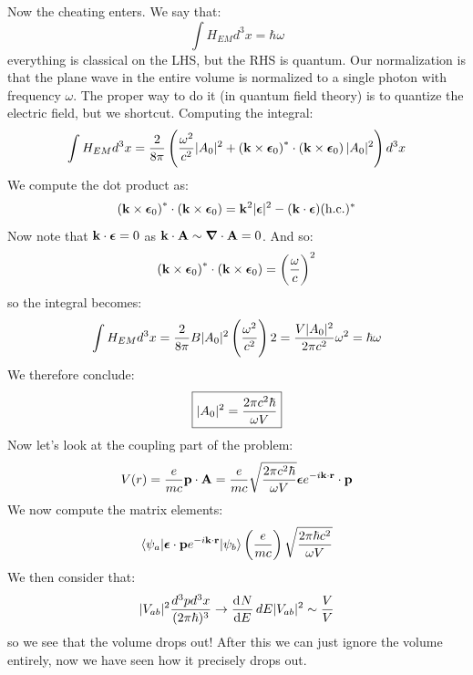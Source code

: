Now the cheating enters. We say that:
\begin{equation}
    \int H_{EM}d^3x = \hbar \omega
\end{equation}
everything is classical on the LHS, but the RHS is quantum. Our normalization is that the plane wave in the entire volume is normalized to a single photon with frequency $\omega$. The proper way to do it (in quantum field theory) is to quantize the electric field, but we shortcut. Computing the integral:
\begin{equation}
    \int H_{EM}d^3x = \frac{2}{8\pi}\left(\frac{\omega^2}{c^2}\lvert A_0 \rvert^2 + \left(\mathbf{k} \times \mbox{\boldmath$ \epsilon $}_0\right)^* \cdot \left(\mathbf{k} \times \mbox{\boldmath$ \epsilon $}_0\right)\lvert A_0 \rvert^2\right) d^3x
\end{equation}
We compute the dot product as:
\begin{equation}
    \left(\mathbf{k} \times \mbox{\boldmath$ \epsilon $}_0\right)^* \cdot \left(\mathbf{k} \times \mbox{\boldmath$ \epsilon $}_0\right) = \mathbf{k}^2\lvert \mbox{\boldmath$ \epsilon $} \rvert^2 - (\mathbf{k} \cdot \mbox{\boldmath$ \epsilon $})(\text{h.c.})^*
\end{equation}
Now note that $\mathbf{k} \cdot \mbox{\boldmath$ \epsilon $} = 0$ as $\v{k} \cdot \v{A} \sim \nabla \cdot \v{A} = 0$. And so:
\begin{equation}
    \left(\mathbf{k} \times \mbox{\boldmath$ \epsilon $}_0\right)^* \cdot \left(\mathbf{k} \times \mbox{\boldmath$ \epsilon $}_0\right) = \left(\frac{\omega}{c}\right)^2
\end{equation} 
so the integral becomes:
\begin{equation}
    \int H_{EM}d^3x = \frac{2}{8\pi}B\lvert A_0 \rvert^2\left(\frac{\omega^2}{c^2}\right)2 = \frac{V\lvert A_0 \rvert^2}{2\pi c^2}\omega^2 = \hbar\omega
\end{equation}
We therefore conclude:
\begin{equation}
    \boxed{\lvert A_0 \rvert^2 = \frac{2\pi c^2 \hbar}{\omega V}}
\end{equation}
Now let's look at the coupling part of the problem:
\begin{equation}
    V(r) = \frac{e}{mc}\mathbf{p} \cdot \mathbf{A} = \frac{e}{mc}\sqrt{\frac{2\pi c^2\hbar}{\omega V}}\mbox{\boldmath$ \epsilon $}e^{-i\mathbf{k \cdot \mathbf{r}}} \cdot \mathbf{p}
\end{equation}
We now compute the matrix elements:
\begin{equation}
    \langle \psi_a \rvert\mbox{\boldmath$ \epsilon $} \cdot \mathbf{p}e^{-i\mathbf{k}\cdot \mathbf{r}}\lvert \psi_b \rangle\left(\frac{e}{mc}\right)\sqrt{\frac{2\pi\hbar c^2}{\omega V}}
\end{equation}
We then consider that:
\begin{equation}
    \abs{V_{ab}}^2\frac{d^3p d^3x}{(2\pi\hbar)^3} \to \dod{N}{E}dE \abs{V_{ab}}^2 \sim \frac{V}{V}
\end{equation}
so we see that the volume drops out! After this we can just ignore the volume entirely, now we have seen how it precisely drops out.

